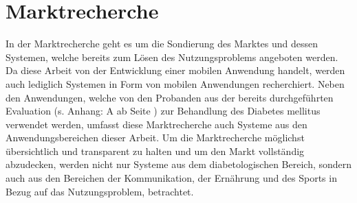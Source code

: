 \documentclass[a4paper,11pt]{article}%
\renewcommand{\\}{\vspace*{0.5\baselineskip} \newline}
\begin{document}
\section{Marktrecherche}
	In der Marktrecherche geht es um die Sondierung des Marktes und dessen Systemen, welche bereits zum Lösen des Nutzungsproblems angeboten werden. Da diese Arbeit von der Entwicklung einer mobilen Anwendung handelt, werden auch lediglich Systemen in Form von mobilen Anwendungen recherchiert. Neben den Anwendungen, welche von den Probanden aus der bereits durchgeführten Evaluation (s. Anhang: A  ab Seite \pageref{section:Evaluation}) zur Behandlung des Diabetes mellitus verwendet werden, umfasst diese Marktrecherche auch Systeme aus den Anwendungsbereichen dieser Arbeit. Um die Marktrecherche möglichst übersichtlich und transparent zu halten und um den Markt vollständig abzudecken, werden nicht nur Systeme aus dem diabetologischen Bereich, sondern auch aus den Bereichen der Kommunikation, der Ernährung und des Sports in Bezug auf das Nutzungsproblem, betrachtet.
\end{document}

